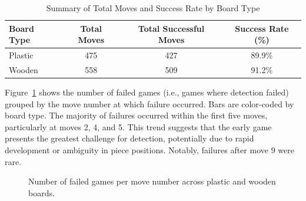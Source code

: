 \begin{table}[htbp]
\centering
\caption{Summary of Total Moves and Success Rate by Board Type}
\label{tab:board-type-accuracy}
\begin{tabular}{lccc}
\toprule
\textbf{Board Type} & \textbf{Total Moves} & \textbf{Total Successful Moves} & \textbf{Success Rate (\%)} \\
\midrule
Plastic & 475 & 427 & 89.9\% \\
Wooden  & 558 & 509 & 91.2\% \\
\bottomrule
\end{tabular}
\end{table}


\newpage

Figure~\ref{fig:move-failures} shows the number of failed games (i.e., games where detection failed) grouped by the move number at which failure occurred. Bars are color-coded by board type. The majority of failures occurred within the first five moves, particularly at moves 2, 4, and 5. This trend suggests that the early game presents the greatest challenge for detection, potentially due to rapid development or ambiguity in piece positions. Notably, failures after move 9 were rare. \\


\begin{figure}[htbp]
\centering
{}
\caption{Number of failed games per move number across plastic and wooden boards.}
\label{fig:move-failures}
\end{figure}


